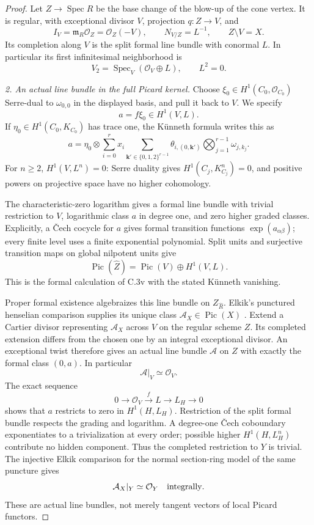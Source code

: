 \begin{proof}
Let $Z\to\operatorname{Spec}R$ be the base change of
the blow-up of the cone vertex. It is regular, with
exceptional divisor $V$, projection $q:Z\to V$, and
\[
 I_V=\mathfrak m_R\mathcal O_Z=\mathcal O_Z(-V),\qquad
 N_{V/Z}=L^{-1},\qquad Z\setminus V=X.
\]
Its completion along $V$ is the split formal line bundle
with conormal $L$. In particular its first infinitesimal
neighborhood is
\[
 V_2=\operatorname{Spec}_V(\mathcal O_V\oplus L),\qquad L^2=0.
\]

\emph{2. An actual line bundle in the full Picard kernel.}
Choose $\xi_0\in H^1(C_0,\mathcal O_{C_0})$ Serre-dual
to $\omega_{0,0}$ in the displayed basis, and pull it
back to $V$. We specify
\[
                       a=f\xi_0\in H^1(V,L).
\]
If $\eta_0\in H^1(C_0,K_{C_0})$ has trace one, the
K\"unneth formula writes this as
\[
 a=\eta_0\otimes
   \sum_{i=0}^{r}x_i
    \sum_{\mathbf k'\in\{0,1,2\}^{r-1}}
       \theta_{i,(0,\mathbf k')}
           \bigotimes_{j=1}^{r-1}\omega_{j,k_j}.
\]
For $n\ge2$, $H^1(V,L^n)=0$: Serre duality gives
$H^1(C_j,K_{C_j}^n)=0$, and positive powers on
projective space have no higher cohomology.

The characteristic-zero logarithm gives a formal line
bundle with trivial restriction to $V$, logarithmic
class $a$ in degree one, and zero higher graded classes.
Explicitly, a \v Cech cocycle for $a$ gives formal
transition functions $\exp(a_{\alpha\beta})$; every
finite level uses a finite exponential polynomial.
Split units and surjective transition maps on global
nilpotent units give
\[
 \operatorname{Pic}(\widehat Z)
       =\operatorname{Pic}(V)\oplus H^1(V,L).
\]
This is the formal calculation of C.3v with the stated
K\"unneth vanishing.

Proper formal existence algebraizes this line bundle
on $Z_{\widehat R}$. Elkik's punctured henselian
comparison supplies its unique class
$\mathcal A_X\in\operatorname{Pic}(X)$
\citep[Theorem 30.27.1, Tag 088E]{rootStacksExistence}
\citep[Section III, Theorem 3 and its Picard corollary,
pp.~569,573]{D_Elkik1973}.
Extend a Cartier divisor representing $\mathcal A_X$
across $V$ on the regular scheme $Z$. Its completed
extension differs from the chosen one by an integral
exceptional divisor. An exceptional twist therefore
gives an actual line bundle $\mathcal A$ on $Z$
with exactly the formal class $(0,a)$. In particular
\[
                         \mathcal A|_V\simeq\mathcal O_V.
\]
The exact sequence
\[
 0\longrightarrow\mathcal O_V\xrightarrow{\ f\ }L
       \longrightarrow L_H\longrightarrow0
\]
shows that $a$ restricts to zero in $H^1(H,L_H)$.
Restriction of the split formal bundle respects the
grading and logarithm. A degree-one \v Cech coboundary
exponentiates to a trivialization at every order;
possible higher $H^1(H,L_H^n)$ contribute no hidden
component. Thus the completed restriction to $Y$ is
trivial. The injective Elkik comparison for the normal
section-ring model of the same puncture gives
\[
                           \mathcal A_X|_Y\simeq\mathcal O_Y
                           \quad\hbox{integrally}.
\]
These are actual line bundles, not merely tangent
vectors of local Picard functors.


\end{proof}
